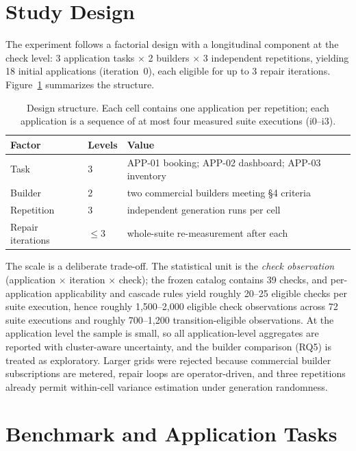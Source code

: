 \section{Study Design}

The experiment follows a factorial design with a longitudinal component at the check
level: 3 application tasks $\times$ 2 builders $\times$ 3 independent repetitions,
yielding 18 initial applications (iteration~0), each eligible for up to 3 repair
iterations. Figure~\ref{tab:design} summarizes the structure.

\begin{table}[tbp]
\centering
\caption{Design structure. Each cell contains one application per repetition; each
application is a sequence of at most four measured suite executions (i0--i3).}
\label{tab:design}
\small
\begin{tabularx}{\textwidth}{llX}
\toprule
Factor & Levels & Value \\
\midrule
Task & 3 & APP-01 booking; APP-02 dashboard; APP-03 inventory \\
Builder & 2 & two commercial builders meeting \S4 criteria \\
Repetition & 3 & independent generation runs per cell \\
Repair iterations & $\leq 3$ & whole-suite re-measurement after each \\
\bottomrule
\end{tabularx}
\end{table}

The scale is a deliberate trade-off. The statistical unit is the \emph{check
observation} (application $\times$ iteration $\times$ check); the frozen catalog
contains 39 checks, and per-application applicability and cascade rules yield
roughly 20--25 eligible checks per suite execution, hence roughly 1,500--2,000
eligible check observations across 72 suite executions and roughly 700--1,200
transition-eligible observations. At the
application level the sample is small, so all application-level
aggregates are reported with cluster-aware uncertainty, and the builder comparison
(RQ5) is treated as exploratory. Larger grids were rejected because commercial
builder subscriptions are metered, repair loops are operator-driven, and three
repetitions already permit within-cell variance estimation under generation
randomness.

\section{Benchmark and Application Tasks}

